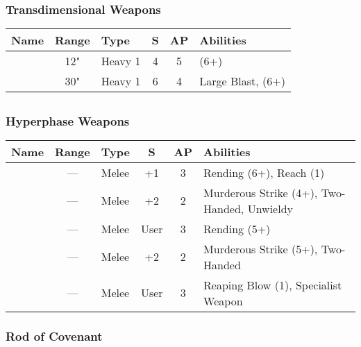 \subsubsection{Transdimensional Weapons}
\label{Transdimensional Beamer}
\noindent
\begin{NiceTabular}{L{115 pt} c C{40pt} *{2}{c} >{\raggedright\arraybackslash}p{240pt}}
	Name & Range & Type & S & AP & Abilities \\
	\hline
	 & 12" & Heavy 1 & 4 & 5 &  (6+) \\
	  & 30" & Heavy 1 & 6 & 4 & Large Blast,  (6+) \\
\end{NiceTabular}


\subsection[Close Combat Weapons]{} \label{Close Combat Weapons}

\subsubsection{Hyperphase Weapons} 

\label{Hyperphase Glaive} \label{Hyperphase Sword} \label{Hyperphase Thresher} \label{Hyperphase Reap-Blade} \label{Hyperphase Harvester}
\noindent
\begin{NiceTabular}{L{115 pt} c C{40pt} *{2}{c} >{\raggedright\arraybackslash}p{240pt}}
	Name & Range & Type & S & AP & Abilities \\
	\hline
	 & — & Melee & +1 & 3 & Rending (6+), Reach (1) \\
	  & — & Melee & +2 & 2 & Murderous Strike (4+), Two-Handed, Unwieldy \\
	 & — & Melee & User & 3 & Rending (5+) \\
	  & — & Melee & +2 & 2 & Murderous Strike (5+), Two-Handed \\
	 & — & Melee & User & 3 & Reaping Blow (1), Specialist Weapon \\
\end{NiceTabular}

\subsubsection{Rod of Covenant} \label{Rod of Covenant}

